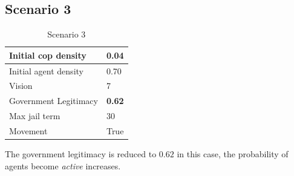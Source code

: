 \documentclass[11pt]{article}
\begin{document}
      \subsection{Scenario 3}
      \begin{table}[ht]
        \begin{center}
          \begin{tabular}{|l|l|}
          \hline
            Initial cop density & 0.04 \\
          \hline
            Initial agent density & 0.70 \\
          \hline
            Vision & 7 \\
          \hline
            Government Legitimacy & \textbf{0.62} \\
          \hline
            Max jail term & 30 \\
          \hline
            Movement & True \\
          \hline
          \end{tabular}
          \caption{Scenario 3}\label{table3}
        \end{center}
      \end{table}
      The government legitimacy is reduced to $0.62$ in this case, the probability
      of agents become \textit{active} increases.
\end{document}
